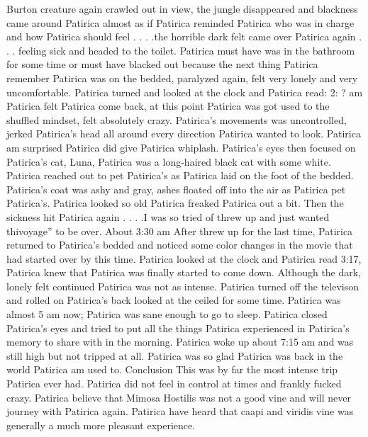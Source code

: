 \documentclass[12pt]{book}
\begin{document}
Burton creature again crawled out in view, the jungle disappeared and blackness came around Patirica almost as if Patirica reminded Patirica who was in charge and how Patirica should feel . . . .the horrible dark felt came over Patirica again . . . feeling sick and headed to the toilet. Patirica must have was in the bathroom for some time or must have blacked out because the next thing Patirica remember Patirica was on the bedded, paralyzed again, felt very lonely and very uncomfortable. Patirica turned and looked at the clock and Patirica read: 2: ? am Patirica felt Patirica come back, at this point Patirica was got used to the shuffled mindset, felt absolutely crazy. Patirica's movements was uncontrolled, jerked Patirica's head all around every direction Patirica wanted to look. Patirica am surprised Patirica did give Patirica whiplash. Patirica's eyes then focused on Patirica's cat, Luna, Patirica was a long-haired black cat with some white. Patirica reached out to pet Patirica's as Patirica laid on the foot of the bedded. Patirica's coat was ashy and gray, ashes floated off into the air as Patirica pet Patirica's. Patirica looked so old Patirica freaked Patirica out a bit. Then the sickness hit Patirica again . . . .I was so tried of threw up and just wanted thivoyage'' to be over. About 3:30 am After threw up for the last time, Patirica returned to Patirica's bedded and noticed some color changes in the movie that had started over by this time. Patirica looked at the clock and Patirica read 3:17, Patirica knew that Patirica was finally started to come down. Although the dark, lonely felt continued Patirica was not as intense. Patirica turned off the televison and rolled on Patirica's back looked at the ceiled for some time. Patirica was almost 5 am now; Patirica was sane enough to go to sleep. Patirica closed Patirica's eyes and tried to put all the things Patirica experienced in Patirica's memory to share with in the morning. Patirica woke up about 7:15 am and was still high but not tripped at all. Patirica was so glad Patirica was back in the world Patirica am used to. Conclusion This was by far the most intense trip Patirica ever had. Patirica did not feel in control at times and frankly fucked crazy. Patirica believe that Mimosa Hostilis was not a good vine and will never journey with Patirica again. Patirica have heard that caapi and viridis vine was generally a much more pleasant experience.
\end{document}
